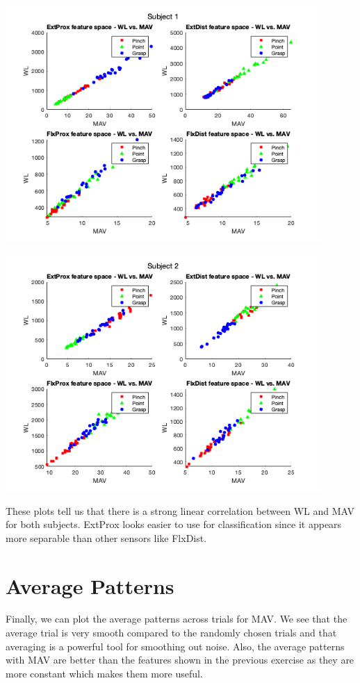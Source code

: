 \documentclass[12pt]{article}
\begin{document}
\begin{center}
    \includegraphics[width=0.9\textwidth]{subject1.png}
\end{center}

\begin{center}
    \includegraphics[width=0.9\textwidth]{subject2.png}
\end{center}

These plots tell us that there is a strong linear correlation between WL and MAV for both subjects. ExtProx looks easier to use for classification since it appears more separable than other sensors like FlxDist.

\section{Average Patterns}

Finally, we can plot the average patterns across trials for MAV. We see that the average trial is very smooth compared to the randomly chosen trials and that averaging is a powerful tool for smoothing out noise. Also, the average patterns with MAV are better than the features shown in the previous exercise as they are more constant which makes them more useful.
\end{document}

